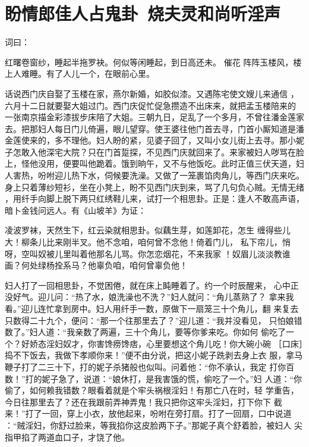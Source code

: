 \chapter{盼情郎佳人占鬼卦~烧夫灵和尚听淫声}

词曰：

红曙卷窗纱，睡起半拖罗袂。何似等闲睡起，到日高还未。  催花
阵阵玉楼风，楼上人难睡。有了人儿一个，在眼前心里。

话说西门庆自娶了玉楼在家，燕尔新婚，如胶似漆。又遇陈宅使文嫂儿来通信
，六月十二日就要娶大姐过门。西门庆促忙促急攒造不出床来，就把孟玉楼陪来的
一张南京描金彩漆拔步床陪了大姐。三朝九日，足乱了一个多月，不曾往潘金莲家
去。把那妇人每日门儿倚遍，眼儿望穿。使王婆往他门首去寻，门首小厮知道是潘
金莲使来的，多不理他。妇人盼的紧，见婆子回了，又叫小女儿街上去寻。那小妮
子怎敢入他深宅大院？只在门首踅探，不见西门庆就回来了。来家被妇人哕骂在脸
上，怪他没用，便要叫他跪着。饿到晌午，又不与他饭吃。此时正值三伏天道，妇
人害热，吩咐迎儿热下水，伺候要洗澡。又做了一笼裹馅肉角儿，等西门庆来吃。
身上只着薄纱短衫，坐在小凳上，盼不见西门庆到来，骂了几句负心贼。无情无绪
，用纤手向脚上脱下两只红绣鞋儿来，试打一个相思卦。正是：逢人不敢高声语，
暗卜金钱问远人。有《山坡羊》为证：

凌波罗袜，天然生下，红云染就相思卦。似藕生芽，如莲卸花，怎生
缠得些儿大！柳条儿比来刚半叉。他不念咱，咱何曾不念他！倚着门儿，
私下帘儿，悄呀，空叫奴被儿里叫着他那名儿骂。你怎恋烟花，不来我家
！奴眉儿淡淡教谁画？何处绿杨拴系马？他辜负咱，咱何曾辜负他！

妇人打了一回相思卦，不觉困倦，就在床上盹睡着了。约一个时辰醒来，
心中正没好气。迎儿问：“热了水，娘洗澡也不洗？”妇人就问：“角儿蒸熟了？
拿来我看。”迎儿连忙拿到房中。妇人用纤手一数，原做下一扇笼三十个角儿，翻
来复去只数得二十九个，便问：“那一个往那里去了？”迎儿道：“我并没看见，
只怕娘错数了。”妇人道：“我亲数了两遍，三十个角儿，要等你爹来吃。你如何
偷吃了一个？好娇态淫妇奴才，你害馋痨馋痞，心里要想这个角儿吃！你大碗小碗
［口床］捣不下饭去，我做下孝顺你来！”便不由分说，把这小妮子跣剥去身上衣
服，拿马鞭子打了二三十下，打的妮子杀猪般也似叫。问着他：“你不承认，我定
打你百数！”打的妮子急了，说道：“娘休打，是我害饿的慌，偷吃了一个。”妇
人道：“你偷了，如何赖我错数？眼看着就是个牢头祸根淫妇！有那亡八在时，轻
学重告，今日往那里去了？还在我跟前弄神弄鬼！我只把你这牢头淫妇，打下你下
截来！”打了一回，穿上小衣，放他起来，吩咐在旁打扇。打了一回扇，口中说道
：“贼淫妇，你舒过脸来，等我掐你这皮脸两下子。”那妮子真个舒着脸，被妇人
尖指甲掐了两道血口子，才饶了他。

